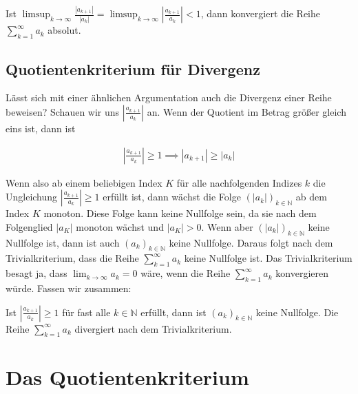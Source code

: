 \documentclass[fontsize=9pt,
               parskip=half-,
               DIV=14,
               listof=chapterentry,
               tocflat]{scrbook}
\begin{document}
\begin{importantparagraph*}
Ist $\limsup _{k\to \infty }{\tfrac {|a_{k+1}|}{|a_{k}|}}=\limsup _{k\to \infty }\left|{\tfrac {a_{k+1}}{a_{k}}}\right|<1$, dann konvergiert die Reihe $\sum _{k=1}^{\infty }a_{k}$ absolut.

\end{importantparagraph*}

\subsection{Quotientenkriterium für Divergenz}

Lässt sich mit einer ähnlichen Argumentation auch die Divergenz einer Reihe beweisen? Schauen wir uns $\left|{\tfrac {a_{k+1}}{a_{k}}}\right|$ an. Wenn der Quotient im Betrag größer gleich eins ist, dann ist

\begin{align*}
\left|{\frac {a_{k+1}}{a_{k}}}\right|\geq 1\implies |a_{k+1}|\geq |a_{k}|
\end{align*}

Wenn also ab einem beliebigen Index $K$ für alle nachfolgenden Indizes $k$ die Ungleichung $\left|{\tfrac {a_{k+1}}{a_{k}}}\right|\geq 1$ erfüllt ist, dann wächst die Folge $\left(|a_{k}|\right)_{k\in \mathbb {N} }$ ab dem Index $K$ monoton. Diese Folge kann keine Nullfolge sein, da sie nach dem Folgenglied $|a_{K}|$ monoton wächst und $|a_{K}|>0$. Wenn aber $\left(|a_{k}|\right)_{k\in \mathbb {N} }$ keine Nullfolge ist, dann ist auch $\left(a_{k}\right)_{k\in \mathbb {N} }$ keine Nullfolge. Daraus folgt nach dem Trivialkriterium, dass die Reihe $\sum _{k=1}^{\infty }a_{k}$ keine Nullfolge ist. Das Trivialkriterium besagt ja, dass $\lim _{k\to \infty }a_{k}=0$ wäre, wenn die Reihe $\sum _{k=1}^{\infty }a_{k}$ konvergieren würde. Fassen wir zusammen:

\begin{importantparagraph*}
Ist $\left|{\tfrac {a_{k+1}}{a_{k}}}\right|\geq 1$ für fast alle $k\in \mathbb {N} $ erfüllt, dann ist $\left(a_{k}\right)_{k\in \mathbb {N} }$ keine Nullfolge. Die Reihe $\sum _{k=1}^{\infty }a_{k}$ divergiert nach dem Trivialkriterium.

\end{importantparagraph*}

\section{Das Quotientenkriterium}
\end{document}
